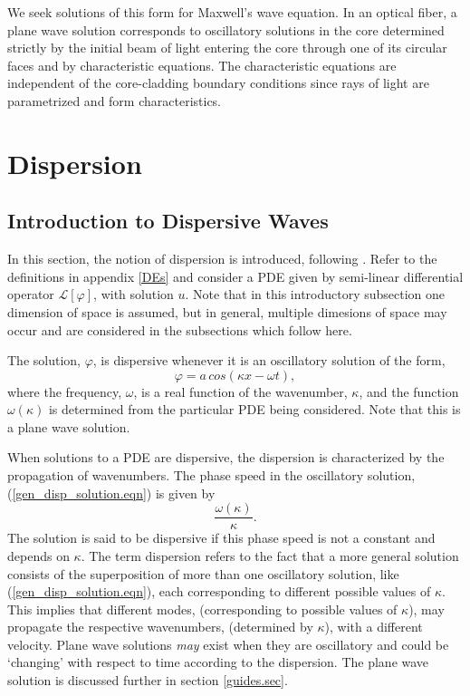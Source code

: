 \documentclass[12pt]{article}
\theoremstyle{definition}
\numberwithin{equation}{section}
\begin{document}
{We seek solutions of this form for Maxwell's wave equation. In an optical fiber, a plane wave solution corresponds to oscillatory solutions in the core determined strictly by the initial beam of light entering the core through one of its circular faces and by characteristic equations. The characteristic equations are independent of the core-cladding boundary conditions since rays of light are parametrized and form characteristics.
\section{Dispersion}
\subsection{Introduction to Dispersive Waves}\label{wavesintro.sec}
In this section, the notion of dispersion is introduced, following \cite{Whitham}. Refer to the definitions in appendix \ref{DEs} and consider a PDE given by semi-linear differential operator $\mathcal{L}[\varphi]$, with solution $u$. Note that in this introductory subsection one dimension of space is assumed, but in general, multiple dimesions of space may occur and are considered in the subsections which follow here.

The solution, $\varphi$, is dispersive whenever it is an oscillatory solution of the form,
\begin{equation}
\varphi= a\,cos(\kappa x - \omega t),
\label{gen_disp_solution.eqn}
\end{equation}
where the frequency, $\omega$, is a real function of the wavenumber, $\kappa$, and the function $\omega(\kappa)$ is determined from the particular PDE being considered. Note that this is a plane wave solution.

When solutions to a PDE are dispersive, the dispersion is characterized by the propagation of wavenumbers. The phase speed in the oscillatory solution, (\ref{gen_disp_solution.eqn}) is given by
$$\frac{\omega(\kappa)}{\kappa}.$$
The solution is said to be dispersive if this phase speed is not a constant and depends on $\kappa$. The term dispersion refers to the fact that a more general solution consists of the superposition of more than one oscillatory solution, like (\ref{gen_disp_solution.eqn}), each corresponding to different possible values of $\kappa$. This implies that different modes, (corresponding to possible values of $\kappa$), may propagate the respective wavenumbers, (determined by $\kappa$), with a different velocity. Plane wave solutions \textit{may} exist when they are oscillatory and could be `changing' with respect to time according to the dispersion. The plane wave solution is discussed further in section \ref{guides.sec}.

}
\end{document}
